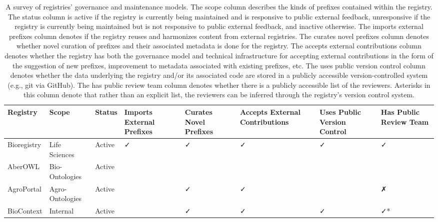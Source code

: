 \begin{table}
\centering
\caption{A survey of registries' governance and maintenance models. The scope column describes the kinds of prefixes contained within the registry. The status column is active if the registry is currently being maintained and is responsive to public external feedback, unresponsive if the registry is currently being maintained but is not responsive to public external feedback, and inactive otherwise. The imports external prefixes column denotes if the registry reuses and harmonizes content from external registries. The curates novel prefixes column denotes whether novel curation of prefixes and their associated metadata is done for the registry. The accepts external contributions column denotes whether the registry has both the governance model and technical infrastructure for accepting external contributions in the form of the suggestion of new prefixes, improvement to metadata associated with existing prefixes, etc. The uses public version control column denotes whether the data underlying the registry and/or its associated code are stored in a publicly accessible version-controlled system (e.g., git via GitHub). The has public review team column denotes whether there is a publicly accessible list of the reviewers. Asterisks in this column denote that rather than an explicit list, the reviewers can be inferred through the registry's version control system.}
\label{tab:registry-comparison-governance}
\begin{tabular}{llllllll}
\toprule
       Registry &           Scope &       Status & Imports External Prefixes & Curates Novel Prefixes & Accepts External Contributions & Uses Public Version Control & Has Public Review Team \\
\midrule
    Bioregistry &   Life Sciences &       Active &                         ✓ &                      ✓ &                              ✓ &                           ✓ &                      ✓ \\
        AberOWL &  Bio-Ontologies &       Active &                           &                        &                                &                             &                        \\
     AgroPortal & Agro-Ontologies &       Active &                           &                      ✓ &                              ✓ &                             &                      ✗ \\
     BioContext &        Internal &       Active &                           &                      ✓ &                              ✓ &                           ✓ &                     ✓* \\

\end{tabular}
\end{table}
